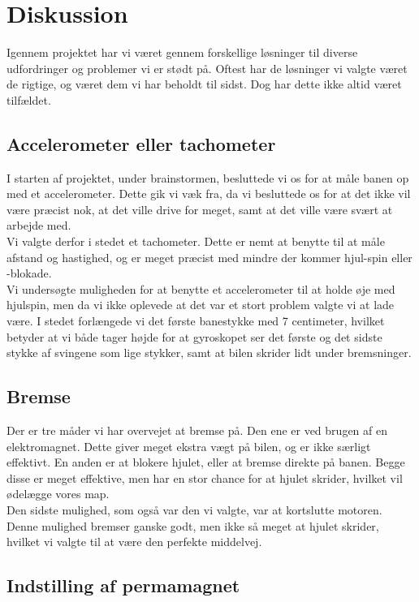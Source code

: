 \section {Diskussion}

Igennem projektet har vi været gennem forskellige løsninger til diverse udfordringer og problemer vi er stødt på. Oftest har de løsninger vi valgte været de rigtige, og været dem vi har beholdt til sidst. Dog har dette ikke altid været tilfældet.

\subsection{Accelerometer eller tachometer}

I starten af projektet, under brainstormen, besluttede vi os for at måle banen op med et accelerometer. Dette gik vi væk fra, da vi besluttede os for at det ikke vil være præcist nok, at det ville drive for meget, samt at det ville være svært at arbejde med.
\\
Vi valgte derfor i stedet et tachometer. Dette er nemt at benytte til at måle afstand og hastighed, og er meget præcist med mindre der kommer hjul-spin eller -blokade.
\\
Vi undersøgte muligheden for at benytte et accelerometer til at holde øje med hjulspin, men da vi ikke oplevede at det var et stort problem valgte vi at lade være. I stedet forlængede vi det første banestykke med 7 centimeter, hvilket betyder at vi både tager højde for at gyroskopet ser det første og det sidste stykke af svingene som lige stykker, samt at bilen skrider lidt under bremsninger.

\subsection{Bremse}

Der er tre måder vi har overvejet at bremse på. Den ene er ved brugen af en elektromagnet. Dette giver meget ekstra vægt på bilen, og er ikke særligt effektivt. En anden er at blokere hjulet, eller at bremse direkte på banen. Begge disse er meget effektive, men har en stor chance for at hjulet skrider, hvilket vil ødelægge vores map.
\\
Den sidste mulighed, som også var den vi valgte, var at kortslutte motoren. Denne mulighed bremser ganske godt, men ikke så meget at hjulet skrider, hvilket vi valgte til at være den perfekte middelvej.

\subsection{Indstilling af permamagnet}

